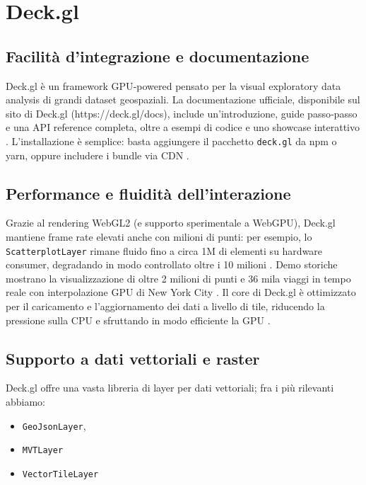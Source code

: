 \section{Deck.gl}
\label{ch:deckgl}

\subsection{Facilità d'integrazione e documentazione}  
Deck.gl è un framework GPU‑powered pensato per la visual exploratory data analysis di grandi dataset geospaziali.  
La documentazione ufficiale, disponibile sul sito di Deck.gl (https://deck.gl/docs), include un'introduzione, guide passo‑passo e una API reference completa, oltre a esempi di codice e uno showcase interattivo \cite{deckgl-docs}.  
L'installazione è semplice: basta aggiungere il pacchetto \texttt{deck.gl} da npm o yarn, oppure includere i bundle via CDN \cite{deckgl-npm,deckgl-github}.  

\subsection{Performance e fluidità dell'interazione}  
Grazie al rendering WebGL2 (e supporto sperimentale a WebGPU), Deck.gl mantiene frame rate elevati anche con milioni di punti: per esempio, lo \texttt{ScatterplotLayer} rimane fluido fino a circa 1M di elementi su hardware consumer, degradando in modo controllato oltre i 10 milioni \cite{deckgl-performance}.  
Demo storiche mostrano la visualizzazione di oltre 2 milioni di punti e 36 mila viaggi in tempo reale con interpolazione GPU di New York City \cite{deckgl-uber-blog}.  
Il core di Deck.gl è ottimizzato per il caricamento e l'aggiornamento dei dati a livello di tile, riducendo la pressione sulla CPU e sfruttando in modo efficiente la GPU \cite{deckgl-github}.  

\subsection{Supporto a dati vettoriali e raster}  
Deck.gl offre una vasta libreria di layer per dati vettoriali; fra i più rilevanti abbiamo: 

\begin{itemize}
    \item \texttt{GeoJsonLayer},
    \item \texttt{MVTLayer}
    \item \texttt{VectorTileLayer}
\end{itemize}


